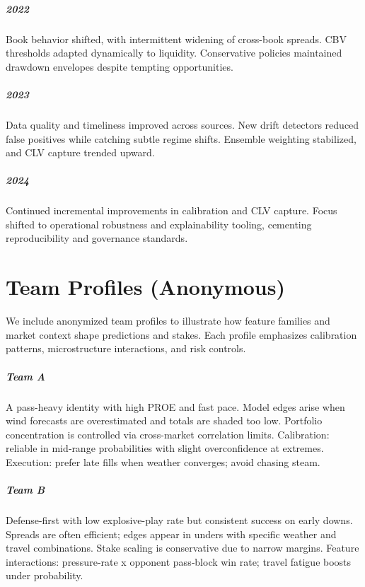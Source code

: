 \documentclass[12pt]{report}  %
\numberwithin{equation}{section}
\theoremstyle{plain}
\theoremstyle{definition}
\theoremstyle{remark}
\begin{document}
\paragraph{2022} Book behavior shifted, with intermittent widening of cross-book spreads. CBV thresholds adapted dynamically to liquidity. Conservative policies maintained drawdown envelopes despite tempting opportunities.

\paragraph{2023} Data quality and timeliness improved across sources. New drift detectors reduced false positives while catching subtle regime shifts. Ensemble weighting stabilized, and CLV capture trended upward.

\paragraph{2024} Continued incremental improvements in calibration and CLV capture. Focus shifted to operational robustness and explainability tooling, cementing reproducibility and governance standards.


\chapter{Team Profiles (Anonymous)}\label{app:team-profiles}
We include anonymized team profiles to illustrate how feature families and market context shape predictions and stakes. Each profile emphasizes calibration patterns, microstructure interactions, and risk controls.

\paragraph{Team A} A pass-heavy identity with high PROE and fast pace. Model edges arise when wind forecasts are overestimated and totals are shaded too low. Portfolio concentration is controlled via cross-market correlation limits. Calibration: reliable in mid‑range probabilities with slight overconfidence at extremes. Execution: prefer late fills when weather converges; avoid chasing steam.

\paragraph{Team B} Defense-first with low explosive-play rate but consistent success on early downs. Spreads are often efficient; edges appear in unders with specific weather and travel combinations. Stake scaling is conservative due to narrow margins. Feature interactions: pressure‑rate x opponent pass‑block win rate; travel fatigue boosts under probability.
\end{document}

